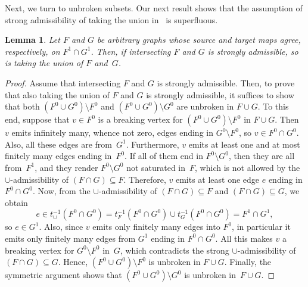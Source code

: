 \documentclass[12pt,times,a4paper]{amsart}
\newtheorem{lemma}[theorem]{Lemma}
\numberwithin{equation}{section}
\numberwithin{equation}{section}
\begin{document}
Next, we turn to unbroken subsets. Our next result shows that the assumption of strong admissibility of taking the union 
in~\cite[Theorem~3.1]{hrt20} is superfluous.
\begin{lemma}\label{captocup}
Let $F$ and $G$ be arbitrary graphs whose source and target maps agree, respectively, on $F^1\cap G^1$. Then, if intersecting  $F$ 
and $G$ is strongly admissible, so is taking the union of $F$ and~$G$.
\end{lemma}
\begin{proof}
Assume that  intersecting $F$ and $G$ is strongly admissible. Then, to prove that also taking the union 
of $F$ and $G$
is strongly admissible, it suffices to show that both $(F^0\cup G^0)\setminus F^0$ and
\mbox{$(F^0\cup G^0)\setminus G^0$}
are unbroken in $F\cup G$. To this end, suppose that 
$v\in F^0$ is a breaking vertex for $(F^0\cup G^0)\setminus F^0$  in $F\cup G$. Then
$v$ emits infinitely many, whence not zero, edges ending in $G^0\setminus F^0$, so $v\in F^0\cap G^0$. Also,
all these edges are from~$G^1$.
Furthermore, $v$ emits at least one and at most finitely many edges ending in~$F^0$. If all of them 
end in $F^0\setminus G^0$, then they are all from~$F^1$, and they render $F^0\setminus G^0$
not saturated in~$F$, which is not allowed by the $\cup$-admissibility of $(F\cap G)\subseteq F$. Therefore,
$v$ emits at least one edge $e$ ending in $F^0\cap G^0$. 
Now, from the $\cup$-admissibility of $(F\cap G)\subseteq F$ and 
$(F\cap G)\subseteq G$,
we obtain
\begin{equation}
e\in t_\cup^{-1}(F^0\cap G^0)=t_F^{-1}(F^0\cap G^0)\cup t_G^{-1}(F^0\cap G^0)=F^1\cap G^1,
\end{equation}
 so $e\in G^1$. Also, since $v$ emits only finitely
many edges into $F^0$, in particular it emits only finitely many edges from $G^1$ ending in $F^0\cap G^0$.
All this makes $v$ a breaking vertex for $G^0\setminus F^0$ in~$G$, which contradicts
 the strong $\cup$-admissibility of $(F\cap G)\subseteq G$. Hence, $(F^0\cup G^0)\setminus F^0$ 
is unbroken in $F\cup G$. Finally, the symmetric argument shows that  $(F^0\cup G^0)\setminus G^0$ 
is unbroken in~$F\cup G$.
\end{proof}
 
\end{document}
